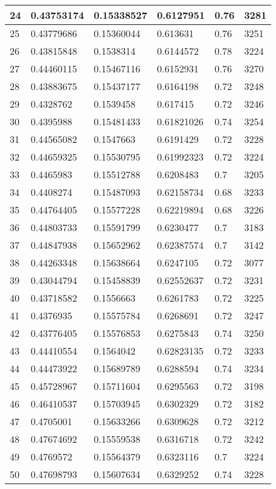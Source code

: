 \begin{longtable}{|l|l|l|l|l|l|}
24 & 0.43753174 & 0.15338527 & 0.6127951 & 0.76 & 3281 \\ \hline 
25 & 0.43779686 & 0.15360044 & 0.613631 & 0.76 & 3251 \\ \hline 
26 & 0.43815848 & 0.1538314 & 0.6144572 & 0.78 & 3224 \\ \hline 
27 & 0.44460115 & 0.15467116 & 0.6152931 & 0.76 & 3270 \\ \hline 
28 & 0.43883675 & 0.15437177 & 0.6164198 & 0.72 & 3248 \\ \hline 
29 & 0.4328762 & 0.1539458 & 0.617415 & 0.72 & 3246 \\ \hline 
30 & 0.4395988 & 0.15481433 & 0.61821026 & 0.74 & 3254 \\ \hline 
31 & 0.44565082 & 0.1547663 & 0.6191429 & 0.72 & 3228 \\ \hline 
32 & 0.44659325 & 0.15530795 & 0.61992323 & 0.72 & 3224 \\ \hline 
33 & 0.4465983 & 0.15512788 & 0.6208483 & 0.7 & 3205 \\ \hline 
34 & 0.4408274 & 0.15487093 & 0.62158734 & 0.68 & 3233 \\ \hline 
35 & 0.44764405 & 0.15577228 & 0.62219894 & 0.68 & 3226 \\ \hline 
36 & 0.44803733 & 0.15591799 & 0.6230477 & 0.7 & 3183 \\ \hline 
37 & 0.44847938 & 0.15652962 & 0.62387574 & 0.7 & 3142 \\ \hline 
38 & 0.44263348 & 0.15638664 & 0.6247105 & 0.72 & 3077 \\ \hline 
39 & 0.43044794 & 0.15458839 & 0.62552637 & 0.72 & 3231 \\ \hline 
40 & 0.43718582 & 0.1556663 & 0.6261783 & 0.72 & 3225 \\ \hline 
41 & 0.4376935 & 0.15575784 & 0.6268691 & 0.72 & 3247 \\ \hline 
42 & 0.43776405 & 0.15576853 & 0.6275843 & 0.74 & 3250 \\ \hline 
43 & 0.44410554 & 0.1564042 & 0.62823135 & 0.72 & 3233 \\ \hline 
44 & 0.44473922 & 0.15689789 & 0.6288594 & 0.74 & 3234 \\ \hline 
45 & 0.45728967 & 0.15711604 & 0.6295563 & 0.72 & 3198 \\ \hline 
46 & 0.46410537 & 0.15703945 & 0.6302329 & 0.72 & 3182 \\ \hline 
47 & 0.4705001 & 0.15633266 & 0.6309628 & 0.72 & 3212 \\ \hline 
48 & 0.47674692 & 0.15559538 & 0.6316718 & 0.72 & 3242 \\ \hline 
49 & 0.4769572 & 0.15564379 & 0.6323116 & 0.7 & 3224 \\ \hline 
50 & 0.47698793 & 0.15607634 & 0.6329252 & 0.74 & 3228 \\ \hline 
\end{longtable}
